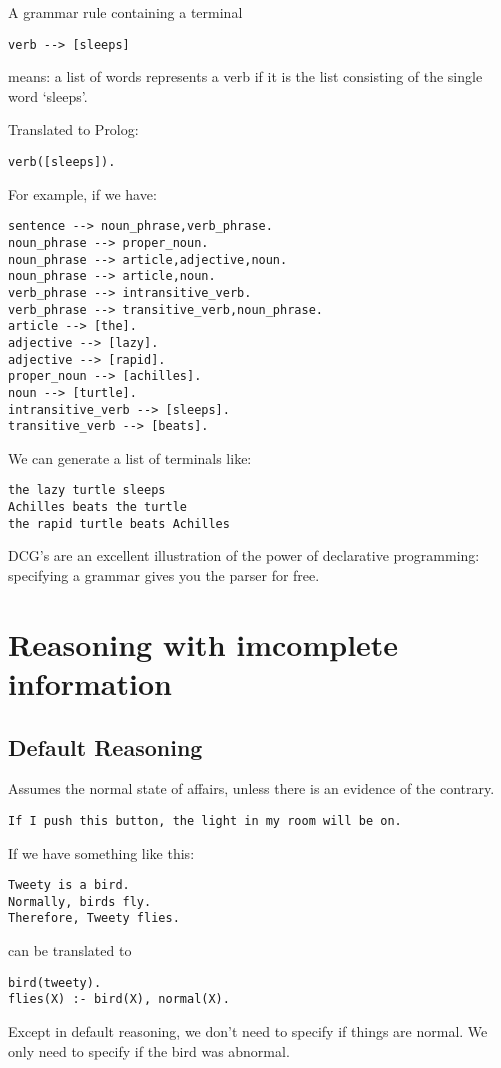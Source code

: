 \documentclass[12pt, oneside]{report}
\numberwithin{definition}{chapter}
\numberwithin{theorem}{chapter}
\numberwithin{lemma}{chapter}
\numberwithin{Rule}{chapter}
\numberwithin{equation}{chapter}
\begin{document}
A grammar rule containing a terminal
\begin{verbatim}
verb --> [sleeps]
\end{verbatim}
means: a list of words represents a verb if it is the list consisting of the single word ‘sleeps’.

Translated to Prolog:
\begin{verbatim}
verb([sleeps]).
\end{verbatim}

For example, if we have: 
\begin{verbatim}
sentence --> noun_phrase,verb_phrase.
noun_phrase --> proper_noun.
noun_phrase --> article,adjective,noun.
noun_phrase --> article,noun.
verb_phrase --> intransitive_verb.
verb_phrase --> transitive_verb,noun_phrase.
article --> [the].
adjective --> [lazy].
adjective --> [rapid].
proper_noun --> [achilles].
noun --> [turtle].
intransitive_verb --> [sleeps].
transitive_verb --> [beats].
\end{verbatim}
We can generate a list of terminals like:
\begin{verbatim}
the lazy turtle sleeps
Achilles beats the turtle
the rapid turtle beats Achilles
\end{verbatim}
DCG's are an excellent illustration of the power of declarative programming: specifying a grammar gives
you the parser for free.

\section{Reasoning with imcomplete information}
\subsection{Default Reasoning}
Assumes the normal state of affairs, unless there is an evidence of the contrary.
\begin{verbatim}
If I push this button, the light in my room will be on.
\end{verbatim}
If we have something like this:
\begin{verbatim}
Tweety is a bird.
Normally, birds fly.
Therefore, Tweety flies.
\end{verbatim}
can be translated to 
\begin{verbatim}
bird(tweety).
flies(X) :- bird(X), normal(X).
\end{verbatim}
Except in default reasoning, we don't need to specify if things are normal. We only need to specify if the bird was abnormal.
\end{document}
